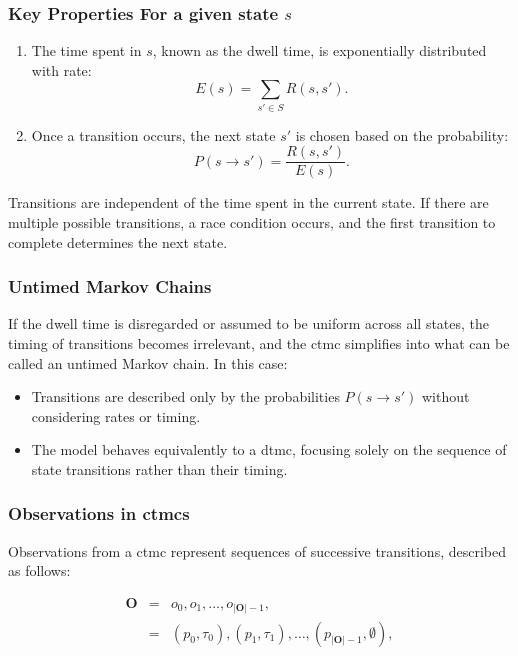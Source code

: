 \subsubsection*{Key Properties For a given state $s$}

\begin{enumerate}
    \item The time spent in $s$, known as the dwell time, is exponentially distributed with rate:
    \begin{equation}
        E(s) = \sum_{s' \in S} R(s, s').
    \end{equation}
    \item Once a transition occurs, the next state $s'$ is chosen based on the probability:
    \begin{equation}
        P(s \rightarrow s') = \frac{R(s, s')}{E(s)}.
    \end{equation}
\end{enumerate}
    
Transitions are independent of the time spent in the current state. If there are multiple possible transitions, a race condition occurs, and the first transition to complete determines the next state.

\subsubsection*{Untimed Markov Chains}
If the dwell time is disregarded or assumed to be uniform across all states, the timing of transitions becomes irrelevant, and the \gls{ctmc} simplifies into what can be called an untimed Markov chain. In this case:
\begin{itemize}
    \item Transitions are described only by the probabilities $P(s \rightarrow s')$ without considering rates or timing.
    \item The model behaves equivalently to a \gls{dtmc}, focusing solely on the sequence of state transitions rather than their timing.
\end{itemize}

\subsubsection*{Observations in \glspl{ctmc}}
Observations from a \gls{ctmc} represent sequences of successive transitions, described as follows:

\begin{eqnarray}
        \textbf{O} &=& o_0, o_1, \dots, o_{|\textbf{O}|-1}, \\ 
                   &=& (p_0,\tau_0), (p_1,\tau_1), \dots, (p_{|\textbf{O}|-1}, \emptyset),  
    \label{eq:observation-sequence} 
\end{eqnarray}

